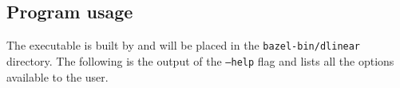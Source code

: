 \begin{appendices}
    \chapter{Program usage}

    The \dlinear executable is built by \bazel and will be placed in the \texttt{bazel-bin/dlinear} directory.
    The following is the output of the \texttt{--help} flag and lists all the options available to the user.

    

\end{appendices}
